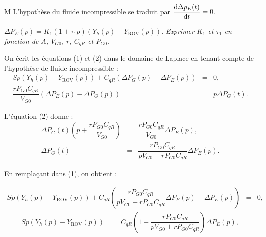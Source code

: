 \begin{multicols}{2}
%
%
%
%
% 
% 
%  
% 
%

M
L’hypothèse du fluide incompressible se traduit par $\dfrac{\text d\Delta p_E(t)}{\text dt}= 0$.
\fi

$\Delta P_E(p) = K_1(1+\tau_1 p)(Y_h(p)-Y_{\text{ROV}}(p)).$
\textit{Exprimer $K_1$ et $\tau_1$ en fonction de $A$, $V_{G0}$, $r$, $C_{qR}$ et $P_{G0}$.}
\ifprof
\begin{corrige}
On écrit les équations (1) et (2) dans le domaine de Laplace en tenant compte de l'hypothèse de fluide incompressible :
 \begin{eqnarray}
{Sp}\left( Y_h(p)-  Y_{\text{ROV}}(p)\right)+C_{qR}\left(\Delta P_G(p)-\Delta P_E(p)\right) &=&0, \\
\dfrac{rP_{G0}C_{qR}}{V_{G0}}\left(\Delta P_E(p)-\Delta P_G(p)\right) &=&p \Delta P_G(t).
\end{eqnarray}

L'équation (2) donne :
 \begin{eqnarray}
\Delta P_G(t)\left(p+\dfrac{rP_{G0}C_{qR}}{V_{G0}}\right)&=&\dfrac{rP_{G0}C_{qR}}{V_{G0}}\Delta P_E(p), \nonumber \\
\Delta P_G(t)&=&\dfrac{rP_{G0}C_{qR}}{pV_{G0}+{rP_{G0}C_{qR}}}\Delta P_E(p).\nonumber
\end{eqnarray}

En remplaçant dans (1), on obtient : 

 \begin{eqnarray}
{Sp}\left( Y_h(p)-  Y_{\text{ROV}}(p)\right)+C_{qR}\left(\dfrac{rP_{G0}C_{qR}}{pV_{G0}+{rP_{G0}C_{qR}}}\Delta P_E(p)-\Delta P_E(p)\right) &=&0, \nonumber
\end{eqnarray}
 \begin{eqnarray}
{Sp}\left( Y_h(p)-  Y_{\text{ROV}}(p)\right)&=&C_{qR}\left(1-\dfrac{rP_{G0}C_{qR}}{pV_{G0}+{rP_{G0}C_{qR}}}\right) \Delta P_E(p), \nonumber
\end{eqnarray}


\end{corrige}
\end{multicols}
